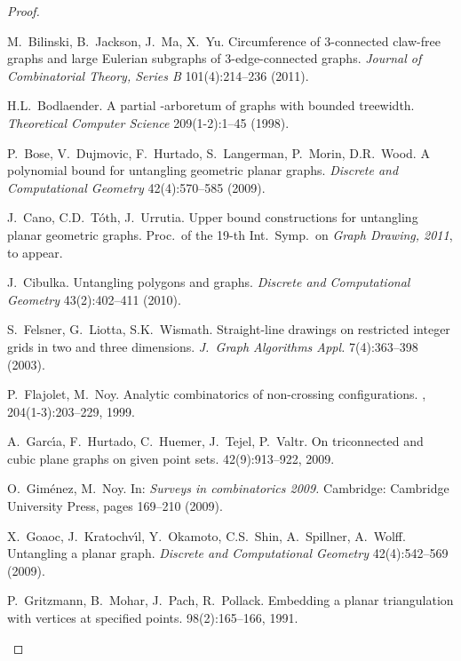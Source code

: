 \documentclass[reqno,12pt]{amsart}
\begin{document}
\begin{proof}
\begin{thebibliography}{10}


M.~Bilinski, B.~Jackson, J.~Ma, X.~Yu.
\newblock
Circumference of 3-connected claw-free graphs and large Eulerian subgraphs 
of 3-edge-connected graphs.
\newblock
{\em Journal of Combinatorial Theory, Series B} 101(4):214--236 (2011).


H.L.~Bodlaender.
\newblock
A partial -arboretum of graphs with bounded treewidth.
\newblock
{\it Theoretical Computer Science} 209(1-2):1--45 (1998).


P.~Bose, V.~Dujmovic, F.~Hurtado, S.~Langerman, P.~Morin, D.R.~Wood.
\newblock
A polynomial bound for untangling geometric planar graphs. 
\newblock
{\em Discrete and Computational Geometry} 42(4):570--585 (2009).

J.~Cano, C.D.~T\'oth, J.~Urrutia.
\newblock
Upper bound constructions for untangling planar geometric graphs.
\newblock
Proc.\ of the 19-th Int.\ Symp.\ on {\em Graph Drawing, 2011},
to appear.

J.~Cibulka.
\newblock
Untangling polygons and graphs.
\newblock
{\em Discrete and Computational Geometry} 43(2):402--411 (2010).

S.~Felsner, G.~Liotta, S.K.~Wismath.
\newblock
Straight-line drawings on restricted integer grids in two and three dimensions. 
\newblock
{\em J.~Graph Algorithms Appl.} 7(4):363--398 (2003).


P.~Flajolet, M.~Noy.
\newblock Analytic combinatorics of non-crossing configurations.
, 204(1-3):203--229, 1999.

A.~Garc\'{\i}a, F.~Hurtado, C.~Huemer, J.~Tejel, P.~Valtr.
\newblock On triconnected and cubic plane graphs on given point sets.
 42(9):913--922, 2009.

O.~Gim\'enez, M.~Noy.
\newblock In: {\it Surveys in combinatorics 2009.}
Cambridge: Cambridge University Press, pages 169--210 (2009).

X.~Goaoc, J.~Kratochv\'{\i}l, Y.~Okamoto, C.S.~Shin, A.~Spillner, A.~Wolff.
\newblock
Untangling a planar graph.
\newblock
{\it Discrete and Computational Geometry\/} 42(4):542--569 (2009).

P.~Gritzmann, B.~Mohar, J.~Pach, R.~Pollack.
\newblock Embedding a planar triangulation with vertices at specified points.
 98(2):165--166, 1991.


\end{thebibliography}
\end{proof}
\end{document}
